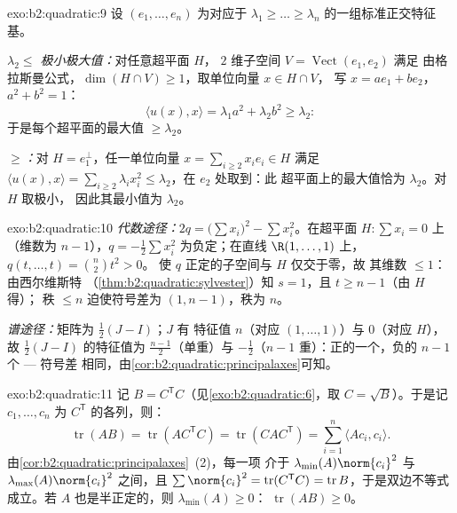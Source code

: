\begin{solution}{exo:b2:quadratic:9}
设 $(e_1, \dots, e_n)$ 为对应于 $\lambda_1
\geq \dots \geq \lambda_n$ 的一组标准正交特征基。

\emph{$\lambda_2 \leq$ 极小极大值：}对任意超平面 $H$，
$2$ 维子空间 $V = \operatorname{Vect}(e_1, e_2)$ 满足
由格拉斯曼公式，$\dim(H \cap V) \geq 1$，取单位向量 $x \in H \cap V$，
写 $x = ae_1 + be_2$，$a^2 + b^2 = 1$：
\[
\langle u(x), x\rangle = \lambda_1 a^2 + \lambda_2 b^2 \geq
\lambda_2 :
\]
于是每个超平面的最大值 $\geq \lambda_2$。

\emph{$\geq$：}对 $H = e_1^{\perp}$，任一单位向量 $x = \sum_{i\geq2}
x_ie_i \in H$ 满足 $\langle u(x), x\rangle = \sum_{i \geq 2}
\lambda_i x_i^2 \leq \lambda_2$，在 $e_2$ 处取到：此
超平面上的最大值恰为 $\lambda_2$。对 $H$ 取极小，
因此其最小值为 $\lambda_2$。
\end{solution}

\begin{solution}{exo:b2:quadratic:10}
\emph{代数途径：}$2q = \bigl(\sum x_i\bigr)^2 - \sum
x_i^2$。在超平面 $H : \sum x_i = 0$ 上（维数为 $n -
1$），$q = -\frac12\sum x_i^2$ 为负定；在直线
$\R(1, \dots, 1)$ 上，$q(t, \dots, t) = \binom n2 t^2 > 0$。
使 $q$ 正定的子空间与 $H$ 仅交于零，故
其维数 $\leq 1$：由西尔维斯特
（\cref{thm:b2:quadratic:sylvester}）知 $s = 1$，且 $t \geq n-1$（由 $H$ 得）；
秩 $\leq n$ 迫使符号差为 $(1, n-1)$，秩为 $n$。

\emph{谱途径：}矩阵为 $\frac12(J - I)$；$J$ 有
特征值 $n$（对应 $(1,\dots,1)$）与 $0$（对应 $H$），故
$\frac12(J-I)$ 的特征值为 $\frac{n-1}{2}$（单重）与
$-\frac12$（$n-1$ 重）：正的一个，负的 $n-1$ 个 --- 符号差
相同，由\cref{cor:b2:quadratic:principalaxes}可知。
\end{solution}

\begin{solution}{exo:b2:quadratic:11}
记 $B = C^{\mathsf T}C$（见\cref{exo:b2:quadratic:6}，取 $C =
\sqrt B$）。于是记 $c_1, \dots, c_n$ 为
$C^{\mathsf T}$ 的各列，则：
\[
\operatorname{tr}(AB) = \operatorname{tr}(AC^{\mathsf T}C)
= \operatorname{tr}(CAC^{\mathsf T})
= \sum_{i=1}^n \langle A c_i, c_i\rangle .
\]
由\cref{cor:b2:quadratic:principalaxes}~(2)，每一项
介于 $\lambda_{\min}(A)\norm{c_i}^2$ 与
$\lambda_{\max}(A)\norm{c_i}^2$ 之间，且 $\sum\norm{c_i}^2 =
\operatorname{tr}(C^{\mathsf T}C)^{\vphantom1} =
\operatorname{tr} B$，于是双边不等式成立。若 $A$
也是半正定的，则 $\lambda_{\min}(A) \geq 0$：
$\operatorname{tr}(AB) \geq 0$。
\end{solution}

